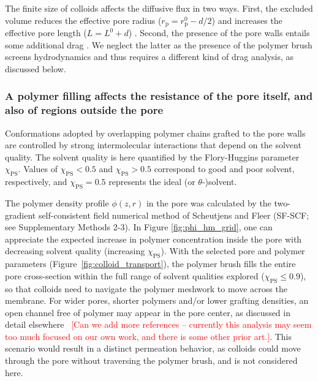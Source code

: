 \documentclass[12pt, a4paper]{article}
\newcommand\todo[1]{\textcolor{red}{#1}}
\begin{document}
The finite size of colloids affects the diffusive flux in two ways.
First, the excluded volume reduces the effective pore radius ($r_{\text{p}} = r_{\text{p}}^0 - d/2$) and increases the effective pore length ($L = L^0 + d$) \cite{Renkin1954, Beck1970, Bungay1973, Anderson1974, Brenner1977}.
Second, the presence of the pore walls entails some additional drag \cite{Ladenburg1907, Faxen1922, Haberman1958}.
We neglect the latter as the presence of the polymer brush screens hydrodynamics and thus requires a different kind of drag analysis, as discussed below.


\subsubsection{A polymer filling affects the resistance of the pore itself, and also of regions outside the pore}

Conformations adopted by overlapping polymer chains grafted to the pore walls are controlled by strong intermolecular interactions that depend on the solvent quality.
The solvent quality is here quantified by the Flory-Huggins parameter $\chi_{\text{PS}}$.
Values of $\chi_{\text{PS}}<0.5$ and $\chi_{\text{PS}}>0.5$ correspond to good and poor solvent, respectively, and $\chi_{\text{PS}}=0.5$ represents the ideal (or $\theta$-)solvent.

The polymer density profile $\phi(z,r)$ in the pore was calculated by the two-gradient self-consistent field numerical method of Scheutjens and Fleer (SF-SCF; see Supplementary Methods 2-3).
In Figure \ref{fig:phi_hm_grid}, one can appreciate the expected increase in polymer concentration inside the pore with decreasing solvent quality (increasing $\chi_{\text{PS}}$).
With the selected pore and polymer parameters (Figure~\ref{fig:colloid_transport}), the polymer brush fills the entire pore cross-section within the full range of solvent qualities explored ($\chi_{\text{PS}}\le0.9$), so that colloids need to navigate the polymer meshwork to move across the membrane.
For wider pores, shorter polymers and/or lower grafting densities, an open channel free of polymer may appear in the pore center, as discussed in detail elsewhere~\cite{Laktionov2021}
\todo{[Can we add more references -- currently this analysis may seem too much focused on our own work, and there is some other prior art.]}.
This scenario would result in a distinct permeation behavior, as colloids could move through the pore without traversing the polymer brush, and is not considered here.
\end{document}
